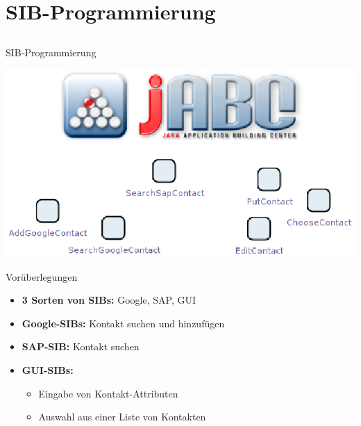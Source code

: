 \section{SIB-Programmierung}

\subsection*{}
\begin{frame}{SIB-Programmierung}
	\begin{center}
		\includegraphics[width=\textheight]{Bilder/titel_sibs.png}
	\end{center}
\end{frame}


\begin{frame}{Vorüberlegungen}
\begin{itemize}[<+->]
	\item \textbf{3 Sorten von SIBs:} Google, SAP, GUI
	\pause
	\item \textbf{Google-SIBs:} Kontakt suchen und hinzufügen
	\item \textbf{SAP-SIB:} Kontakt suchen
	\pause
	\item \textbf{GUI-SIBs:}
		\begin{itemize}[<+->]
			\item Eingabe von Kontakt-Attributen
			\item Auswahl aus einer Liste von Kontakten
		\end{itemize}

\end{itemize}
\end{frame}



